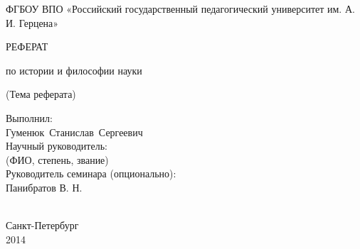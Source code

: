 \thispagestyle{empty}

\begin{center}
ФГБОУ ВПО «Российский государственный педагогический университет
им. А. И. Герцена» \par 
\par
\end{center}



\vspace{50mm}

\begin{center}
РЕФЕРАТ 

по истории и философии науки 

(Тема реферата) 

\end{center}

\vspace{20mm}
\begin{flushright}
\begin{minipage}
{0.4\textwidth} 
Выполнил:\\
Гуменюк~Станислав~Сергеевич\\ 

Научный руководитель: \\
(ФИО, степень, звание) \\

Руководитель семинара (опционально): \\
Панибратов В. Н.\\
\\[0.3cm] 
\end{minipage}

\end{flushright}

\vfill
\begin{center}
{Санкт-Петербург \\ 2014}
\end{center}

\newpage